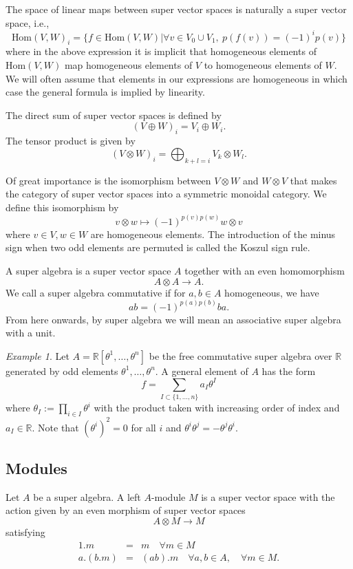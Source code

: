 \documentclass[11pt]{amsart}
\numberwithin{equation}{section}
\numberwithin{figure}{section}
\theoremstyle{plain}
\theoremstyle{definition}
\theoremstyle{remark}
\newtheorem{example}[thm]{Example}
\begin{document}
The space of linear maps between super vector spaces is naturally
a super vector space, i.e., 
\[
\mbox{Hom}(V,W)_{i}=\{f\in\mbox{Hom}(V,W)|\forall v\in V_{0}\cup V_{1},\ p(f(v))=(-1)^{i}p(v)\}
\]
where in the above expression it is implicit that homogeneous elements
of $\mbox{Hom}(V,W)$ map homogeneous elements of $V$ to homogeneous
elements of $W$. We will often assume that elements in our expressions
are homogeneous in which case the general formula is implied by linearity. 

The direct sum of super vector spaces is defined by 
\[
\left(V\oplus W\right)_{i}=V_{i}\oplus W_{i}.
\]
The tensor product is given by 
\[
\left(V\otimes W\right)_{i}=\bigoplus_{k+l=i}V_{k}\otimes W_{l}.
\]


Of great importance is the isomorphism between $V\otimes W$ and $W\otimes V$
that makes the category of super vector spaces into a symmetric monoidal
category. We define this isomorphism by
\[
v\otimes w\mapsto(-1)^{p(v)p(w)}w\otimes v
\]
where $v\in V,w\in W$ are homogeneous elements. The introduction
of the minus sign when two odd elements are permuted is called the
Koszul sign rule.

A super algebra is a super vector space $A$ together with an even
homomorphism 
\[
A\otimes A\rightarrow A.
\]
We call a super algebra commutative if for $a,b\in A$ homogeneous,
we have 
\[
ab=(-1)^{p(a)p(b)}ba.
\]
From here onwards, by super algebra we will mean an associative super
algebra with a unit.
\begin{example}
Let $A=\mathbb{R}[\theta^{1},\dots,\theta^{n}]$ be the free commutative
super algebra over $\mathbb{R}$ generated by odd elements $\theta^{1},\dots,\theta^{n}$.
A general element of $A$ has the form 
\[
f=\sum_{I\subset\{1,\dots,n\}}a_{I}\theta^{I}
\]
where $\theta_{I}:=\prod_{i\in I}\theta^{i}$ with the product taken
with increasing order of index and $a_{I}\in\mathbb{R}$. Note that
$(\theta^{i})^{2}=0$ for all $i$ and $\theta^{i}\theta^{j}=-\theta^{j}\theta^{i}$. 
\end{example}

\subsection{Modules}

Let $A$ be a super algebra. A left $A$-module $M$ is a super vector
space with the action given by an even morphism of super vector spaces
\[
A\otimes M\rightarrow M
\]
satisfying 
\begin{eqnarray*}
1.m & = & m\hspace{1em}\forall m\in M\\
a.(b.m) & = & (ab).m\hspace{1em}\forall a,b\in A,\hspace{1em}\forall m\in M.
\end{eqnarray*}
\end{document}
